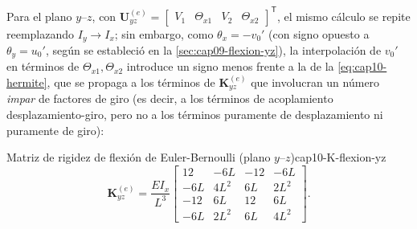 Para el plano $y$--$z$, con $\bm U^{(e)}_{yz}=\begin{bmatrix}V_1&\Theta_{x1}&V_2&\Theta_{x2}\end{bmatrix}^{\mathsf T}$, el mismo cálculo se repite reemplazando $I_y\to I_x$; sin embargo, como $\theta_x=-v_0'$ (con signo opuesto a $\theta_y=u_0'$, según se estableció en la \cref{sec:cap09-flexion-yz}), la interpolación de $v_0'$ en términos de $\Theta_{x1},\Theta_{x2}$ introduce un signo menos frente a la de la \cref{eq:cap10-hermite}, que se propaga a los términos de $\bm K^{(e)}_{yz}$ que involucran un número \emph{impar} de factores de giro (es decir, a los términos de acoplamiento desplazamiento-giro, pero no a los términos puramente de desplazamiento ni puramente de giro):

\begin{ecnimportante}{Matriz de rigidez de flexión de Euler-Bernoulli (plano \texorpdfstring{$y$--$z$}{y-z})}{cap10-K-flexion-yz}
\[
\bm K^{(e)}_{yz} = \frac{EI_x}{L^3}
\begin{bmatrix}
12 & -6L & -12 & -6L \\
-6L & 4L^2 & 6L & 2L^2 \\
-12 & 6L & 12 & 6L \\
-6L & 2L^2 & 6L & 4L^2
\end{bmatrix} .
\]
\end{ecnimportante}

